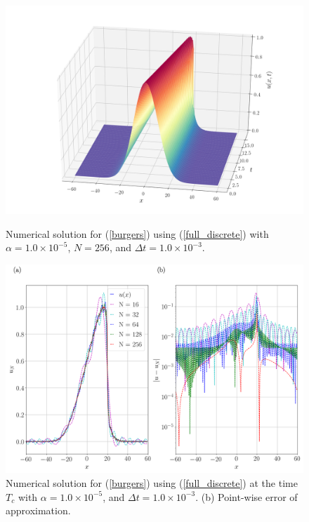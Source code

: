 	\begin{figure}[H]
		\centering
		\includegraphics[width=12cm]{Figures/small_alpha.png}
		\caption{Numerical solution for (\ref{burgers}) using (\ref{full_discrete}) with $\alpha = 1.0 \times 10^{-5}$, $N=256$, and $\Delta t = 1.0 \times 10^{-3}$.}
		\vspace{2mm}
		\includegraphics[width=12.5cm]{Figures/small_alpha_T.png}
		\caption{Numerical solution for (\ref{burgers}) using (\ref{full_discrete}) at the time $T_c$ with $\alpha = 1.0 \times 10^{-5}$, and $\Delta t = 1.0 \times 10^{-3}$. (b) Point-wise error of approximation.}
	\end{figure}
